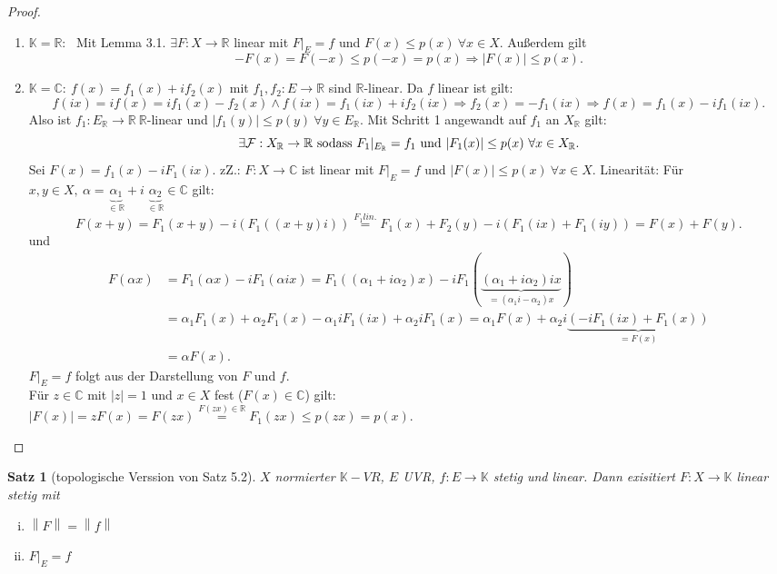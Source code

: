 \documentclass[ngerman]{report}
\theoremstyle{plain}%
\newtheorem{thm}{Satz}[chapter]
\theoremstyle{definition}%
\theoremstyle{myStyle}
\newcommand{\C}{\mathbb{C}}
\newcommand{\R}{\mathbb{R}}
\newcommand{\K}{\mathbb{K}}
\newcommand{\norm}[1]{\left \|#1\right\| }
\newcommand{\df}[1][]{%
	\overset{#1}{\Rightarrow}
}
\begin{document}
		\begin{proof}
		\begin{enumerate}
			\item $\K=\R$: ~Mit Lemma 3.1. $\exists F:X \to \R$ linear mit $F|_E=f$ und $F(x)\leq p(x)~\forall x \in X$. Außerdem gilt
			$$-F(x)=F(-x)\leq p(-x)=p(x) \df |F(x)|\leq p(x).$$
			\item $\K=\C: ~f(x)=f_1(x)+if_2(x)$ mit $f_1,f_2: E \to \R$ sind $\R$-linear. Da $f$ linear ist gilt:
			$$ f(ix)=if(x)=if_1(x)-f_2(x) \wedge f(ix)=f_1(ix)+if_2(ix) \df f_2(x)=-f_1(ix) \df f(x)=f_1(x)-if_1(ix).$$
			Also ist $f_1:E_\R \to \R ~ \R$-linear und $|f_1(y)|\leq p(y) ~\forall y \in E_\R$. Mit Schritt 1 angewandt auf $f_1$ an $X_\R$ gilt:
			$$ \exists \F:X_\R \to\R \text{ sodass } F_1|_{E_\R}=f_1 \text{ und } |F_1(x)| \leq p(x) ~\forall x \in X_\R.$$
			Sei $F(x)=f_1(x)-iF_1(ix)$. zZ.: $F:X\to\C$ ist linear mit $F|_E=f$ und $|F(x)| \leq p(x) ~\forall x \in X$.
			Linearität: Für $x,y \in X, ~\alpha=\underbrace{\alpha_1}_{\in \R} + i ~\underbrace{\alpha_2}_{\in \R} \in \C$ gilt:
		$$ F(x+y)=F_1(x+y)-i(F_1((x+y)i))\overset{F_1 lin.}{=}F_1(x)+F_2(y)-i(F_1(ix)+F_1(iy))=F(x)+F(y).  $$ und
			\begin{align*}
				F(\alpha x) &= F_1(\alpha x) -iF_1(\alpha ix)=F_1((\alpha_1+i\alpha_2)x) - iF_1(\underbrace{(\alpha_1+i\alpha_2)ix}_{=(\alpha_1 i-\alpha_2)x})\\
				&=\alpha_1 F_1(x)+ \alpha_2 F_1(x)-\alpha_1 i F_1(ix) + \alpha_2 i F_1(x)= \alpha_1 F(x) +\alpha_2 i \underbrace{(-i F_1(ix)+F_1(x))}_{=F(x)}\\
				&= \alpha F(x).
			\end{align*}
			$F|_E=f$ folgt aus der Darstellung von $F$ und $f$.\\
			Für $z \in \C$ mit $|z|=1$ und $x \in X$ fest ($F(x) \in \C$) gilt:\\
			$|F(x)|=zF(x)=F(zx)\overset{F(zx) \in \R}{=} F_1(zx) \leq p(zx)=p(x)$.
		\end{enumerate}
	\end{proof}

	\begin{thm}[topologische Verssion von Satz 5.2]
		$X$ normierter $\K-VR$, $E$ UVR, $f: E\to \K$ stetig und linear. Dann exisitiert $F : X\to \K$ linear stetig mit 
				\begin{enumerate}[(i)]
					\item $\norm{F} = \norm{f}$
					\item $F|_E = f$
				\end{enumerate}
	\end{thm}
	
\end{document}

